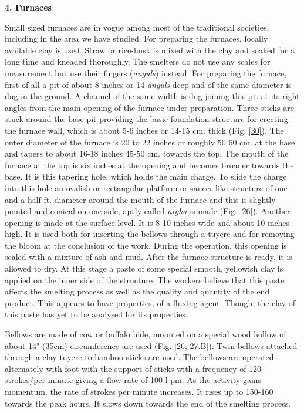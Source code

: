 \noindent \textbf{\large 4.  Furnaces}

Small sized furnaces are in vogue among most of the traditional societies, including in the area we have studied. For preparing the furnaces, locally available clay is used. Straw or rice-husk is mixed with the clay and soaked for a long time and kneaded thoroughly. The smelters do not use any scales for measurement but use their fingers ({\it anguls}) instead. For preparing the furnace, first of all a pit of about 8 inches or 14 {\it anguls} deep and of the same diameter is dug in the ground. A channel of the same width is dug joining this pit at its right angles from the main opening of the furnace under preparation. Three sticks are stuck around the base-pit providing the basic foundation structure for erecting the furnace wall, which is about 5-6 inches or 14-15 cm. thick (Fig. \ref{30}). The outer diameter of the furnace is 20 to 22 inches or roughly 50 60 cm. at the base and tapers to about 16-18 inches 45-50 cm. towards the top. The mouth of the furnace at the top is six inches at the opening and becomes broader towards the base. It is this tapering hole, which holds the main charge. To slide the charge into this hole an ovalish or rectangular platform or saucer like structure of one and a half ft. diameter around the mouth of the furnace and this is slightly pointed and conical on one side, aptly called {\it argha} is made (Fig. \ref{26}). Another opening is made at the surface level. It is 8-10 inches wide and about 10 inches high. It is used both for inserting the bellows through a tuyere and for removing the bloom at the conclusion of the work. During the operation, this opening is sealed with a mixture of ash and mud. After the furnace structure is ready, it is allowed to dry. At this stage a paste of some special smooth, yellowish clay is applied on the inner side of the structure. The workers believe that this paste affects the smelting process as well as the quality and quantity of the end product. This appears to have properties, of a fluxing agent. Though, the clay of this paste has yet to be analysed for its properties.

Bellows are made of cow or buffalo hide, mounted on a special wood hollow of about 14" (35cm) circumference are used (Fig. \ref{26; 27.B}). Twin bellows attached through a clay tuyere to bamboo sticks are used. The bellows are operated alternately with foot with the support of sticks with a frequency of 120-strokes/per minute giving a flow rate of 100 l pm. As the activity gains momentum, the rate of strokes per minute increases. It rises up to 150-160 towards the peak hours. It slows down towards the end of the smelting process.


